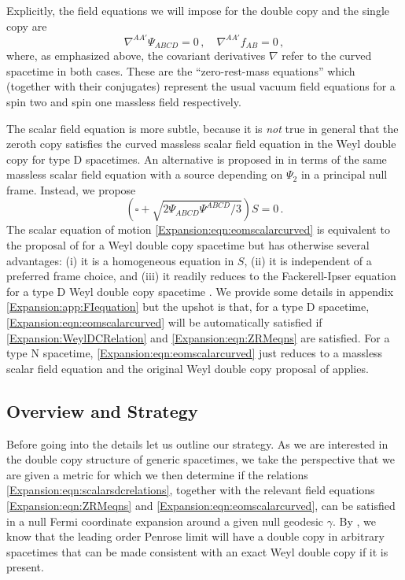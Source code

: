Explicitly, the field equations we will impose for the double copy and the single copy are
\begin{equation}\label{Expansion:eqn:ZRMeqns}
\nabla^{AA'}\Psi_{ABCD} = 0 \, , \quad \nabla^{AA'} f_{AB} = 0 \, ,
\end{equation}
where, as emphasized above, the covariant derivatives $\nabla$ refer to the curved spacetime in both cases. These are the
``zero-rest-mass equations'' \cite{Penrose:1985bww} which (together with their conjugates) represent the usual vacuum field equations for a spin two and spin one massless field respectively.

The scalar field equation is more subtle, because it is \emph{not} true in general that the zeroth copy satisfies the curved massless scalar field equation in the Weyl double copy for type D spacetimes. An alternative is proposed in \cite{Godazgar:2021iae} in terms of the same massless scalar field equation with a source depending on $\Psi_2$ in a principal null frame. Instead, we propose 
\begin{equation}\label{Expansion:eqn:eomscalarcurved}
\left(\square  +  \sqrt{2 \Psi_{ABCD} \Psi^{ABCD}/3}\right) S = 0\, .
\end{equation}
The scalar equation of motion \eqref{Expansion:eqn:eomscalarcurved} is equivalent to the proposal of \cite{Godazgar:2021iae} for a Weyl double copy spacetime but has otherwise several advantages: (i) it is a homogeneous equation in $S$, (ii) it is independent of a preferred frame choice, and (iii) it readily reduces to the Fackerell-Ipser equation for a type D Weyl double copy spacetime \cite{Fackerell:1972hg}. We provide some details in appendix \ref{Expansion:app:FIequation} but the upshot is that, for a type D spacetime, \eqref{Expansion:eqn:eomscalarcurved} will be automatically satisfied if \eqref{Expansion:WeylDCRelation} and \eqref{Expansion:eqn:ZRMeqns} are satisfied. For a type N spacetime, \eqref{Expansion:eqn:eomscalarcurved} just reduces to a massless scalar field equation and the original Weyl double copy proposal of \cite{Luna:2018dpt} applies.

\subsection{Overview and Strategy}\label{Expansion:sec:overview}
Before going into the details let us outline our strategy. As we are interested in the double copy structure of generic spacetimes, we take the perspective that we are given a metric for which we then determine if the relations \eqref{Expansion:eqn:scalarsdcrelations}, together with the relevant field equations \eqref{Expansion:eqn:ZRMeqns} and \eqref{Expansion:eqn:eomscalarcurved}, can be satisfied in a null Fermi coordinate expansion around a given null geodesic $\gamma$. By \cite{Chawla:2024mse}, we know that the leading order Penrose limit will have a double copy in arbitrary spacetimes that can be made consistent with an exact Weyl double copy if it is present. 


